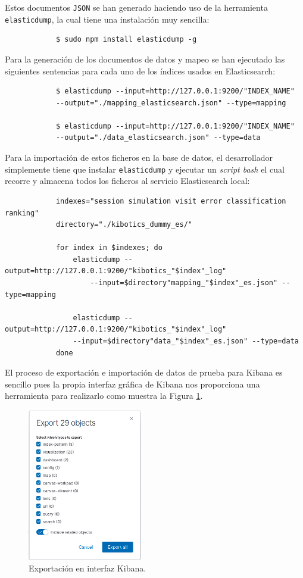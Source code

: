 \documentclass[a4paper, 12pt]{book}
\begin{document}
		Estos documentos \texttt{JSON} se han generado haciendo uso de la herramienta \texttt{elasticdump}, la cual tiene una instalación muy sencilla:
		
		{\footnotesize
		\begin{verbatim}
			$ sudo npm install elasticdump -g
		\end{verbatim}
		}
		Para la generación de los documentos de datos y mapeo se han ejecutado las siguientes sentencias para cada uno de los índices usados en Elasticsearch:
		
		{\footnotesize
		\begin{verbatim}
			$ elasticdump --input=http://127.0.0.1:9200/"INDEX_NAME" 
			--output="./mapping_elasticsearch.json" --type=mapping
			
			$ elasticdump --input=http://127.0.0.1:9200/"INDEX_NAME" 
			--output="./data_elasticsearch.json" --type=data
		\end{verbatim}
		}
	
		Para la importación de estos ficheros en la base de datos, el desarrollador simplemente tiene que instalar \texttt{elasticdump} y ejecutar un \textit{script bash} el cual recorre y almacena todos los ficheros al servicio Elasticsearch local:
		
		{\footnotesize
		\begin{verbatim}
			indexes="session simulation visit error classification ranking"
			directory="./kibotics_dummy_es/"
			
			for index in $indexes; do
			    elasticdump --output=http://127.0.0.1:9200/"kibotics_"$index"_log" 
			        --input=$directory"mapping_"$index"_es.json" --type=mapping
			
			    elasticdump --output=http://127.0.0.1:9200/"kibotics_"$index"_log" 
		        --input=$directory"data_"$index"_es.json" --type=data
			done
		\end{verbatim}
		}
		
		El proceso de exportación e importación de datos de prueba para Kibana es sencillo pues la propia interfaz gráfica de Kibana nos proporciona una herramienta para realizarlo como muestra la Figura \ref{fig:export_kibana}.
		
		\begin{figure}[H]
			\centering
			\includegraphics[width=5cm, keepaspectratio]{img/export_kibana.png}
			\caption{Exportación en interfaz Kibana.}
			\label{fig:export_kibana}
		\end{figure}
		
\end{document}
